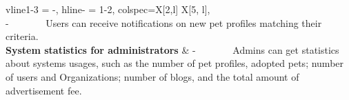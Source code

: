 \begin{longtblr}[
    caption = {Functional Requirements},
    label = {tblr:func_req},
  ]{
    vline{1-3} = {-}{},
    hline{-} = {1-2}{},
    colspec={X[2,l] X[5, l]},
  }
{  \\-~~~~~~~
      Users can receive notifications on new pet profiles matching their
      criteria.
  }                                                                     \\
  \textbf{System statistics for administrators} & { -~~~~~~~
      Admins can get statistics about systems usages, such as the number of pet profiles, adopted pets; number of users and Organizations; number of blogs, and the total amount of advertisement fee.
  }                                                                     \\
\end{longtblr}
